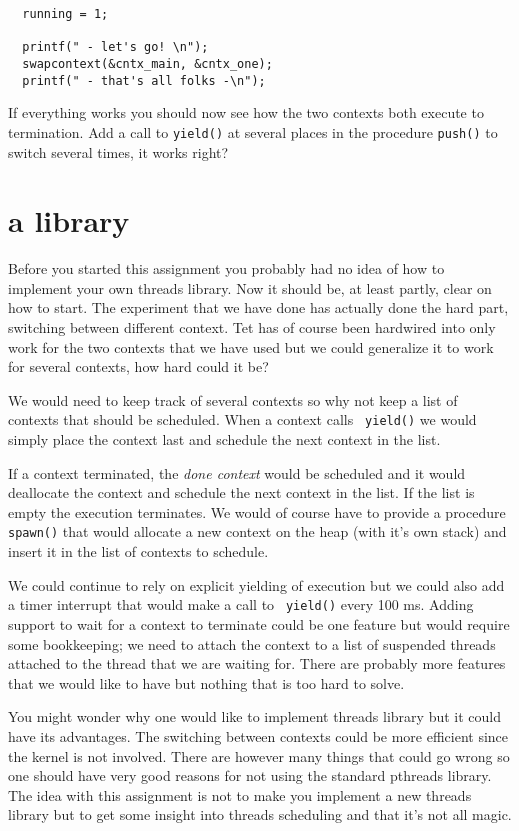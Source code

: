 \documentclass[a4paper,11pt]{article}
\begin{document}
\begin{lstlisting}
  running = 1;

  printf(" - let's go! \n");  
  swapcontext(&cntx_main, &cntx_one);
  printf(" - that's all folks -\n");
\end{lstlisting}

If everything works you should now see how the two contexts both
execute to termination. Add a call to {\tt yield()} at several places
in the procedure {\tt push()} to switch several times, it works right?

\section{a library}

Before you started this assignment you probably had no idea of how to
implement your own threads library. Now it should be, at least partly,
clear on how to start. The experiment that we have done has actually
done the hard part, switching between different context. Tet has of
course been hardwired into only work for the two contexts that we have
used but we could generalize it to work for several contexts, how hard could it be?

We would need to keep track of several contexts so why not keep a list
of contexts that should be scheduled. When a context calls {\tt
  yield()} we would simply place the context last and schedule the
next context in the list.

If a context terminated, the {\em done context} would be scheduled and
it would deallocate the context and schedule the next context in the
list. If the list is empty the execution terminates. We would of
course have to provide a procedure {\tt spawn()} that would allocate a
new context on the heap (with it's own stack) and insert it in the list
of contexts to schedule.

We could continue to rely on explicit yielding of execution but we
could also add a timer interrupt that would make a call to {\tt
  yield()} every 100 ms. Adding support to wait for a context to
terminate could be one feature but would require some bookkeeping; we
need to attach the context to a list of suspended threads attached to
the thread that we are waiting for. There are probably more features
that we would like to have but nothing that is too hard to solve. 

You might wonder why one would like to implement threads library but
it could have its advantages. The switching between contexts could be
more efficient since the kernel is not involved. There are however many
things that could go wrong so one should have very good reasons for
not using the standard pthreads library. The idea with this assignment
is not to make you implement a new threads library but to get some
insight into threads scheduling and that it's not all magic.
\end{document}
